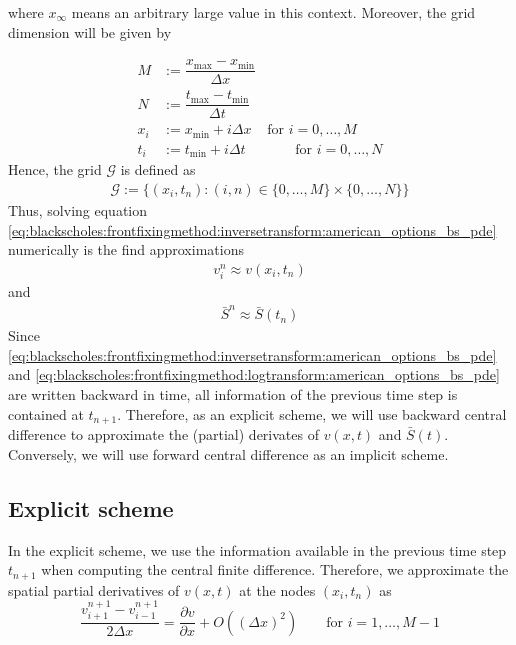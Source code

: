 where $x_{\infty}$ means an arbitrary large value in this context. Moreover, the grid
dimension will be given by

\begin{align}
  M &:= \dfrac{x_{\text{max}} - x_{\text{min}}}{\Delta x} \\ 
  N &:= \dfrac{t_{\text{max}} - t_{\text{min}}}{\Delta t} \\ 
  x_i &:= x_{\text{min}} + i\Delta x & \text{for $i = 0,\dots, M$} \\
  t_i &:= t_{\text{min}} + i{\Delta t} & \qquad \text{for $i = 0,\dots, N$}
\end{align}
Hence, the grid $\mathcal{G}$ is defined as
\begin{align}
  \mathcal{G} := \{(x_i, t_n): (i, n) \in \{0,\dots,M\}\times\{0,\dots,N\}\}
\end{align}
Thus, solving equation \eqref{eq:blackscholes:frontfixingmethod:inversetransform:american_options_bs_pde}
numerically is the find approximations 
\begin{align*}
  v^{n}_i \approx v(x_i,t_n)
\end{align*}
and
\begin{align*}
  \bar{S}^{n} \approx \bar{S}(t_n)
\end{align*}
Since \eqref{eq:blackscholes:frontfixingmethod:inversetransform:american_options_bs_pde}
and \eqref{eq:blackscholes:frontfixingmethod:logtransform:american_options_bs_pde}
are written backward in time, all information of the previous time step is contained
at $t_{n+1}$. Therefore, as an explicit scheme, we will use backward central difference 
to approximate the (partial) derivates of $v(x, t)$ and $\bar{S}(t)$. Conversely,
we will use forward central difference as an implicit scheme. 

\subsection{Explicit scheme}

In the explicit scheme, we use the information available in the previous time 
step $t_{n+1}$ when computing the central finite difference. 
Therefore, we approximate the spatial partial derivatives of $v(x,t)$ at the nodes
$(x_{i},t_{n})$ as
\begin{equation}
  \dfrac{v^{n+1}_{i+1} - v^{n+1}_{i-1}}{2 \Delta{x}} = \dfrac{\partial{v}}{\partial{x}}+ O((\Delta{x})^2) \qquad \text{for $i = 1, \dots, M - 1$}
\end{equation}

